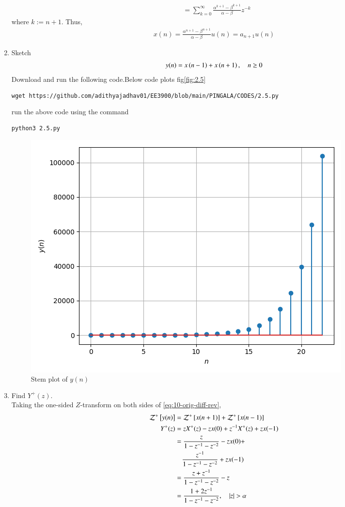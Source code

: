\documentclass[journal,12pt,twocolumn]{IEEEtran}
\renewcommand\thesection{\arabic{section}}
\begin{document}
\begin{enumerate}[label=\thesection.\arabic*,ref=\thesection.\theenumi]
\begin{align}
           &= \sum_{k = 0}^{\infty}\frac{\alpha^{k + 1} - \beta^{k + 1}}{\alpha - \beta}z^{-k}
\end{align}
where $k := n + 1$. Thus,
\begin{align}
    x(n) = \frac{\alpha^{n + 1} - \beta^{n + 1}}{\alpha - \beta}u(n) = a_{n + 1}u(n)
    \label{eq:x-n-def}
\end{align}
\item Sketch 
\begin{align}
y(n) = x\left(n-1\right) + x\left(n+1\right),  \quad n \ge 0
\label{eq:10-orig-diff-rev}
\end{align}
\solution Download and run the following code.Below code plots fig\eqref{fig:2.5}
\begin{lstlisting}
wget https://github.com/adithyajadhav01/EE3900/blob/main/PINGALA/CODES/2.5.py
\end{lstlisting}
run the above code using the command
\begin{lstlisting}
python3 2.5.py
\end{lstlisting}
\begin{figure}[h]
    \centering
    \includegraphics[width=\columnwidth]{./FIGURES/2.5.png}
    \caption{Stem plot of $y(n)$}
    \label{fig:2.5}
\end{figure}


	\item Find $Y^{+}(z)$. \\
	\solution Taking the one-sided $Z$-transform on both sides of \eqref{eq:10-orig-diff-rev},
\begin{align}
\mathcal{Z}^+{}\left[y(n)\right] &= \mathcal{Z}^+{}\left[x(n + 1)\right] + \mathcal{Z}^+{}\left[x(n - 1)\right] \\
Y^+(z) &= zX^+(z) - zx(0) + z^{-1}X^+(z) + zx(-1) \\
&= \frac{z}{1 - z^{-1} - z^{-2}} - zx(0) + \nonumber\\
&\quad \frac{z^{-1}}{1 - z^{-1} - z^{-2}} + zx(-1) \\
&= \frac{z + z^{-1}}{1 - z^{-1} - z^{-2}} - z \\
&= \frac{1 + 2z^{-1}}{1 - z^{-1} - z^{-2}}, \quad |z| > \alpha
\end{align}


\end{enumerate}
\end{document}
